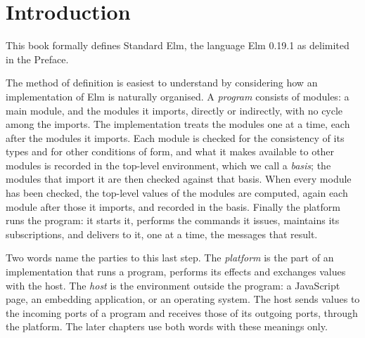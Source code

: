 
\chapter{Introduction}\label{ch:introduction}

This book formally defines Standard Elm, the language Elm 0.19.1 as
delimited in the Preface.

The method of definition is easiest to understand by considering how an
implementation of Elm is naturally organised. A \emph{program} consists of
modules: a main module, and the modules it imports, directly or indirectly,
with no cycle among the imports. The implementation treats the modules one at
a time, each after the modules it imports. Each module is checked for the
consistency of its types and for other conditions of form, and what it makes available to other modules is
recorded in the top-level environment, which we call a \emph{basis}; the
modules that import it are then checked against that basis. When every
module has been checked, the top-level values of the modules are computed,
again each module after those it imports, and recorded in the basis. Finally
the platform runs the program: it starts it, performs the commands it
issues, maintains its subscriptions, and delivers to it, one at a time, the
messages that result.

Two words name the parties to this last step. The \emph{platform} is the
part of an implementation that runs a program, performs its effects and
exchanges values with the host. The \emph{host} is the environment outside
the program: a JavaScript page, an embedding application, or an operating
system. The host sends values to the incoming ports of a program and
receives those of its outgoing ports, through the platform. The later
chapters use both words with these meanings only. %

